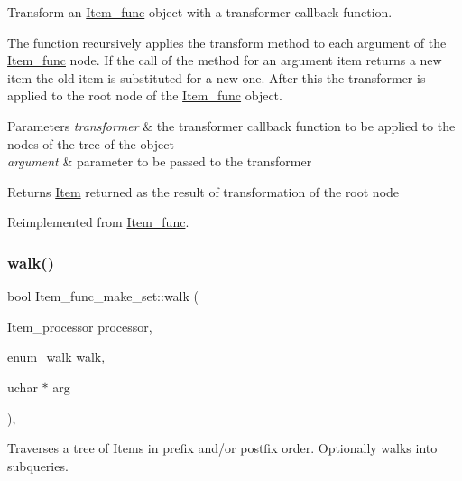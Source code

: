Transform an \mbox{\hyperlink{classItem__func}{Item\+\_\+func}} object with a transformer callback function.

The function recursively applies the transform method to each argument of the \mbox{\hyperlink{classItem__func}{Item\+\_\+func}} node. If the call of the method for an argument item returns a new item the old item is substituted for a new one. After this the transformer is applied to the root node of the \mbox{\hyperlink{classItem__func}{Item\+\_\+func}} object. 
\begin{DoxyParams}{Parameters}
{\em transformer} & the transformer callback function to be applied to the nodes of the tree of the object \\
\hline
{\em argument} & parameter to be passed to the transformer\\
\hline
\end{DoxyParams}
\begin{DoxyReturn}{Returns}
\mbox{\hyperlink{classItem}{Item}} returned as the result of transformation of the root node 
\end{DoxyReturn}


Reimplemented from \mbox{\hyperlink{classItem__func_a808d0fe427eec3c050ee5214594b8908}{Item\+\_\+func}}.

\mbox{\label{classItem__func__make__set_a75791f36ac076834fdd42c7081d8d763}} 
\subsubsection{\texorpdfstring{walk()}{walk()}}
{\footnotesize\ttfamily bool Item\+\_\+func\+\_\+make\+\_\+set\+::walk (\begin{DoxyParamCaption}\item[{Item\+\_\+processor}]{processor,  }\item[{\mbox{\hyperlink{classItem_a4e68f315ba2a26543339e9f0efed3695}{enum\+\_\+walk}}}]{walk,  }\item[{uchar $\ast$}]{arg }\end{DoxyParamCaption})\hspace{0.3cm}{\ttfamily [inline]}, {\ttfamily [virtual]}}

Traverses a tree of Items in prefix and/or postfix order. Optionally walks into subqueries.


